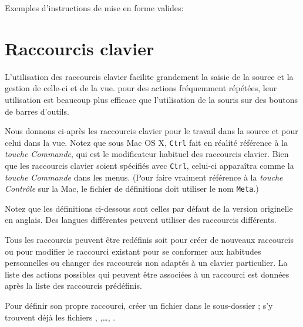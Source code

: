 Exemples d'instructions de mise en forme valides:

\section{Raccourcis clavier}
\label{sec.shortcuts}


L'utilisation des raccourcis clavier facilite grandement la saisie de la source et la gestion de celle-ci et de la vue. pour des actions fréquemment répétées, leur utilisation est beaucoup plus efficace que l'utilisation de la souris sur des boutons de barres d'outils.

Nous donnons ci-après les raccourcis clavier pour le travail dans la source et pour celui dans la vue. Notez que sous Mac OS X, \verb|Ctrl| fait en réalité référence à la \emph{touche Commande}, qui est le modificateur habituel des raccourcis clavier. Bien que les raccourcis clavier soient spécifiés avec \verb|Ctrl|, celui-ci apparaîtra comme la \emph{touche Commande} dans les menus. (Pour faire vraiment référence à la \emph{touche Contrôle} sur la Mac, le fichier de définitions doit utiliser le nom \verb|Meta|.)

Notez que les définitions ci-dessous sont celles par défaut de la version originelle en anglais. Des langues différentes peuvent utiliser des raccourcis différents.%

Tous les raccourcis peuvent être redéfinis soit pour créer de nouveaux raccourcis ou pour modifier le raccourci existant pour se conformer aux habitudes personnelles ou changer des raccourcis non adaptés à un clavier particulier. La liste des actions possibles qui peuvent être associées à un raccourci est données après la liste des raccourcis prédéfinis.

Pour définir son propre raccourci, créer un fichier  dans le sous-dossier ; s'y trouvent déjà les fichiers , ,\dots, .

